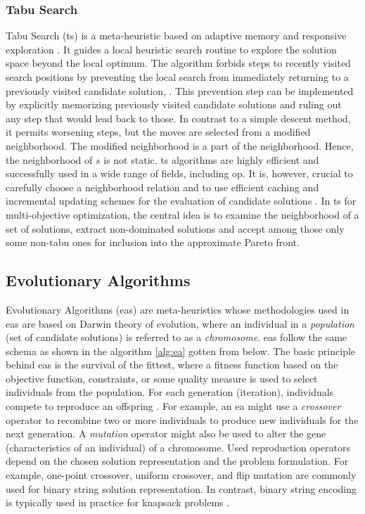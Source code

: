 \subsubsection{Tabu Search}
Tabu Search (\gls{ts}) is a meta-heuristic based on adaptive memory and responsive exploration \parencite{Gonzalez2007HandbookMetaheuristics}. It guides a local heuristic search routine to explore the solution
space beyond the local optimum. The algorithm forbids steps to recently visited search positions by preventing the local search from immediately returning to a previously visited candidate solution, \parencite{HolgerH2013StochasticApplications}. This prevention step can be implemented by explicitly memorizing previously visited candidate solutions and ruling out any step that would lead back to those. In contrast to a simple descent method, it permits worsening steps, but the moves are selected from a modified neighborhood. The modified neighborhood is a part of the neighborhood. Hence, the neighborhood of $s$ is not static. \Gls{ts} algorithms are highly efficient and successfully used in a wide range of fields, including \gls{op}. It is, however, crucial to carefully choose a neighborhood relation and to use efficient caching and incremental updating schemes for the evaluation of candidate solutions \parencite{HolgerH2013StochasticApplications}. In \gls{ts} for multi-objective optimization, the central idea is to examine the neighborhood of a set of solutions, extract non-dominated solutions and accept among those only some non-tabu ones for inclusion into the approximate Pareto front. 

\subsection{Evolutionary Algorithms}
Evolutionary Algorithms (\glspl{ea}) are meta-heuristics whose methodologies used in \glspl{ea} are based on Darwin theory of evolution, where an individual in a \textit{population} (set of candidate solutions) is referred to as a \textit{chromosome}. \glspl{ea} follow the same schema as shown in the algorithm \ref{alg:ea} gotten from \parencite{Gonzalez2007HandbookMetaheuristics} below. The basic principle behind \glspl{ea} is the survival of the fittest, where a fitness function based on the objective function, constraints, or some quality measure is used to select individuals from the population. For each generation (iteration), individuals compete to reproduce an offspring \parencite{Engelbrecht2007ComputationalEdition}. For example, an \gls{ea} might use a \textit{crossover} operator to recombine two or more individuals to produce new individuals for the next generation. A \textit{mutation} operator might also be used to alter the gene (characteristics of an individual) of a chromosome. Used reproduction operators depend on the chosen solution representation and the problem formulation. For example, one-point crossover, uniform crossover, and flip mutation are commonly used for binary string solution representation. In contrast, binary string encoding is typically used in practice for knapsack problems \parencite{Gonzalez2007HandbookMetaheuristics}.  

